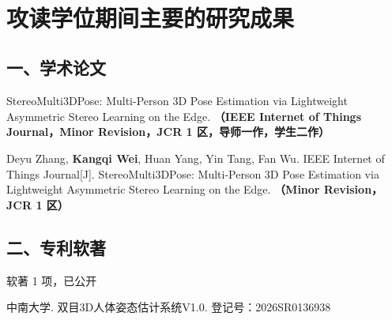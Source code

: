 
{~}
\vspace{18pt}
\section{攻读学位期间主要的研究成果} %

\vspace{11pt}
\subsection*{一、学术论文}

\ifblindreview
\begin{enumerate}[label={[\arabic*]},itemindent=2em,wide]
	\item   StereoMulti3DPose: Multi-Person 3D Pose Estimation via
Lightweight Asymmetric Stereo Learning on the Edge. {\bfseries \heiti（IEEE Internet of Things Journal，Minor Revision，JCR 1 区，导师一作，学生二作）}
\end{enumerate}
\else
\begin{enumerate}[label={[\arabic*]},itemindent=2em,wide]
	\item Deyu Zhang, \textbf{Kangqi Wei}, Huan Yang, Yin Tang, Fan Wu. IEEE Internet of Things Journal[J]. StereoMulti3DPose: Multi-Person 3D Pose Estimation via
Lightweight Asymmetric Stereo Learning on the Edge. {\bfseries \heiti（Minor Revision，JCR 1 区）}
\end{enumerate}
\fi

\vspace{22pt}
\subsection*{二、专利软著}
\ifblindreview
软著 1 项，已公开
\else
\begin{enumerate}[label={[\arabic*]},itemindent=2em,wide]
	\item 中南大学. 双目3D人体姿态估计系统V1.0. 登记号：2026SR0136938
\end{enumerate}
\fi

\ifblindreview
\else


